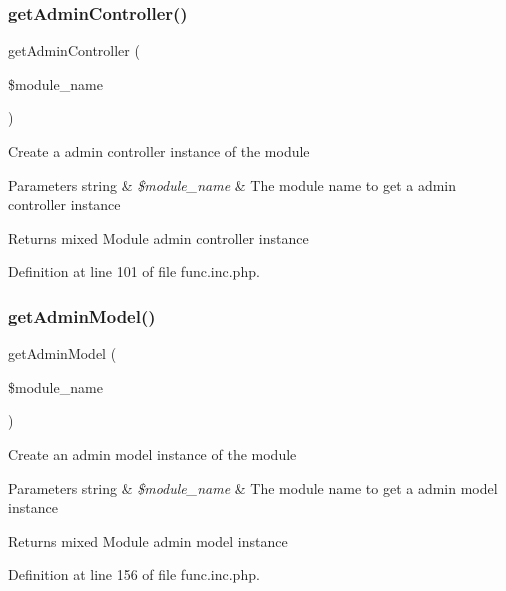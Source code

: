 \subsubsection{\texorpdfstring{get\+Admin\+Controller()}{getAdminController()}}
{\footnotesize\ttfamily get\+Admin\+Controller (\begin{DoxyParamCaption}\item[{}]{\$module\+\_\+name }\end{DoxyParamCaption})}

Create a admin controller instance of the module


\begin{DoxyParams}[1]{Parameters}
string & {\em \$module\+\_\+name} & The module name to get a admin controller instance \\
\hline
\end{DoxyParams}
\begin{DoxyReturn}{Returns}
mixed Module admin controller instance 
\end{DoxyReturn}


Definition at line 101 of file func.\+inc.\+php.

\hypertarget{func_8inc_8php_a902cd0c884e75afab2682fdd3ae3791f}{}\label{func_8inc_8php_a902cd0c884e75afab2682fdd3ae3791f} 
\subsubsection{\texorpdfstring{get\+Admin\+Model()}{getAdminModel()}}
{\footnotesize\ttfamily get\+Admin\+Model (\begin{DoxyParamCaption}\item[{}]{\$module\+\_\+name }\end{DoxyParamCaption})}

Create an admin model instance of the module


\begin{DoxyParams}[1]{Parameters}
string & {\em \$module\+\_\+name} & The module name to get a admin model instance \\
\hline
\end{DoxyParams}
\begin{DoxyReturn}{Returns}
mixed Module admin model instance 
\end{DoxyReturn}


Definition at line 156 of file func.\+inc.\+php.

